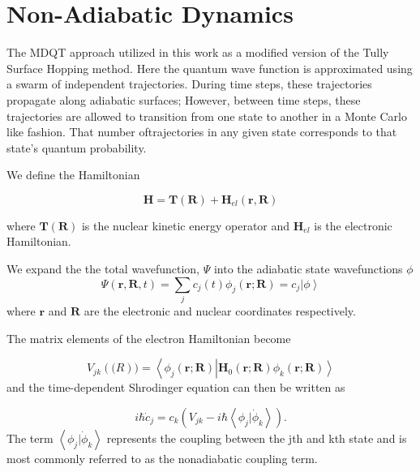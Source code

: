 \section{Non-Adiabatic Dynamics}

The MDQT approach utilized in this work as a modified version of the Tully Surface Hopping method.
Here the quantum wave function is approximated using a swarm of independent trajectories.
During time steps, these trajectories propagate along adiabatic surfaces;
However, between time steps, these trajectories are allowed to transition from one state to another in a Monte Carlo like fashion.
That number oftrajectories in any given state corresponds to that state's quantum probability.

We define the Hamiltonian

\begin{equation} \label{eq:tullyHamiltonian} \mathbf{H} = \mathbf{T}(\mathbf{R}) +
  \mathbf{H}_{el}(\mathbf{r},\mathbf{R})
\end{equation}

where \(\mathbf{T}(\mathbf{R}) \) is the nuclear kinetic energy operator and \(\textbf{H}_{el}\) is the electronic Hamiltonian.

We expand the the total wavefunction, \(\Psi\) into the adiabatic state wavefunctions \(\phi\)
\begin{equation}
  \Psi(\textbf{r}, \textbf{R}, t) = \sum_j c_j(t)\phi_j(\textbf{r}; \textbf{R}) = c_j \left| \phi \right>
\end{equation}
where \(\textbf{r}\) and \(\textbf{R}\) are the electronic and nuclear coordinates respectively.


The matrix elements of the electron Hamiltonian become

\begin{equation} \label{eq:tullyVelements}
  V_{jk}(\mathbf(R))=\left<\phi_j(\mathbf{r};\mathbf{R})\right|\mathbf{H}_{0}\left.(\mathbf{r};\mathbf{R})\phi_k(\mathbf{r};\mathbf{R})\right>
\end{equation}
and the time-dependent Shrodinger equation can then be written as

\begin{equation}
  i\hbar\dot{c}_j = c_k ( V_{jk} - i\hbar \left< \phi_j | \dot{\phi}_k \right> ).
\end{equation}
The term \(\left< \phi_j | \dot{\phi}_k \right>\) represents the coupling between the jth and kth state and is most commonly referred to as the nonadiabatic coupling term.

